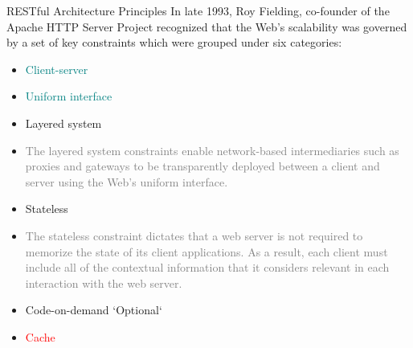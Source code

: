 \documentclass{beamer}
\begin{document}
\begin{frame}[t]{RESTful Architecture Principles}
	\scriptsize
	In late 1993, Roy Fielding, co-founder of the Apache HTTP Server Project recognized that the Web’s scalability was governed by a set of key constraints which were grouped under six categories:
	\begin{itemize}
    	\item \textcolor{teal}{Client-server}
    	\item \textcolor{teal}{Uniform interface}

    	\item Layered system
    	\item[] \textcolor{gray}{\tiny The layered system constraints enable network-based intermediaries such as proxies and gateways to be transparently deployed between a client and server using the Web’s uniform interface.} 
    	
    	\item Stateless
    	\item[] \textcolor{gray}{ \tiny The stateless constraint dictates that a web server is not required to memorize the state of its client applications. As a result, each client must include all of the contextual information that it considers relevant in each interaction with the web server. }
    	
    	\item Code-on-demand `Optional`
    	\item \textcolor{red} {Cache}
	\end{itemize}
\end{frame}
\end{document}
